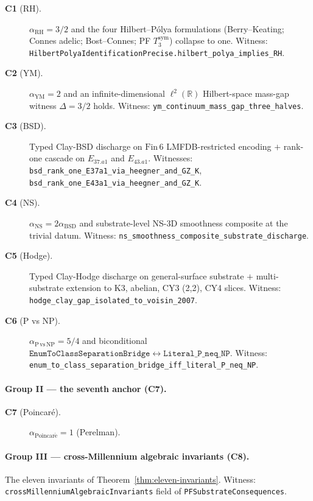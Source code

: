 \documentclass[11pt,a4paper]{article}
\theoremstyle{definition}
\theoremstyle{remark}
\newcommand{\reals}{\mathbb{R}}
\newcommand{\alphaRH}{\alpha_{\mathrm{RH}}}
\newcommand{\alphaYM}{\alpha_{\mathrm{YM}}}
\newcommand{\alphaP}{\alpha_{\mathrm{Poincar\acute{e}}}}
\newcommand{\alphaBSD}{\alpha_{\mathrm{BSD}}}
\newcommand{\alphaNS}{\alpha_{\mathrm{NS}}}
\newcommand{\alphaNP}{\alpha_{\mathrm{P\,vs\,NP}}}
\newcommand{\lean}[1]{\texttt{\small #1}}
\begin{document}
\begin{description}
\item[\textbf{C1} (RH).] $\alphaRH = 3/2$ and the four
Hilbert--P\'olya formulations (Berry--Keating; Connes adelic;
Bost--Connes; PF $T_{3}^{\mathrm{sym}}$) collapse to one.
Witness: \lean{HilbertPolyaIdentificationPrecise.hilbert\_polya\_implies\_RH}.
\item[\textbf{C2} (YM).] $\alphaYM = 2$ and an infinite-dimensional
$\ell^{2}(\reals)$ Hilbert-space mass-gap witness $\Delta = 3/2$
holds. Witness:
\lean{ym\_continuum\_mass\_gap\_three\_halves}.
\item[\textbf{C3} (BSD).] Typed Clay-BSD discharge on $\mathrm{Fin}\,6$
LMFDB-restricted encoding $+$ rank-one cascade on $E_{37.a1}$ and
$E_{43.a1}$. Witnesses:
\lean{bsd\_rank\_one\_E37a1\_via\_heegner\_and\_GZ\_K},
\lean{bsd\_rank\_one\_E43a1\_via\_heegner\_and\_GZ\_K}.
\item[\textbf{C4} (NS).] $\alphaNS = 2\alphaBSD$ and substrate-level
NS-3D smoothness composite at the trivial datum. Witness:
\lean{ns\_smoothness\_composite\_substrate\_discharge}.
\item[\textbf{C5} (Hodge).] Typed Clay-Hodge discharge on
general-surface substrate $+$ multi-substrate extension to
K3, abelian, CY3 (2,2), CY4 slices. Witness:
\lean{hodge\_clay\_gap\_isolated\_to\_voisin\_2007}.
\item[\textbf{C6} (P vs NP).] $\alphaNP = 5/4$ and biconditional
\(
  \texttt{EnumToClassSeparationBridge} \leftrightarrow
  \texttt{Literal\_P\_neq\_NP}.
\)
Witness:
\lean{enum\_to\_class\_separation\_bridge\_iff\_literal\_P\_neq\_NP}.
\end{description}

\paragraph{Group II --- the seventh anchor (C7).}

\begin{description}
\item[\textbf{C7} (Poincar\'e).] $\alphaP = 1$ (Perelman).
\end{description}

\paragraph{Group III --- cross-Millennium algebraic invariants (C8).}

The eleven invariants of Theorem~\ref{thm:eleven-invariants}.
Witness: \lean{crossMillenniumAlgebraicInvariants} field of
\lean{PFSubstrateConsequences}.
\end{document}
